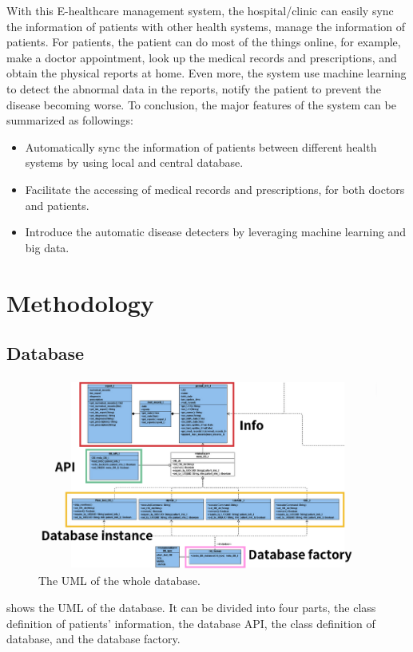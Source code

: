 \documentclass{article}
\begin{document}
  With this E-healthcare management system, the hospital/clinic can easily 
  sync the information of patients with other health systems, manage 
  the information of patients.
  For patients, the patient can do most of the things online, for example, 
  make a doctor appointment, look up the medical records and prescriptions, 
  and obtain the physical reports at home. Even more, the system use machine 
  learning to detect the abnormal data in the reports, notify the patient 
  to prevent the disease becoming worse. 
  To conclusion, the major features of the system can be summarized as 
  followings: 
  \begin{itemize}
    \item Automatically sync the information of patients between different health systems by using local and central database. 
    \item Facilitate the accessing of medical records and prescriptions, for both doctors and patients. 
    \item Introduce the automatic disease detecters by leveraging machine learning and big data. 
  \end{itemize}

\section{Methodology}
\label{sec:methodology}
  \subsection*{Database}
  \begin{figure}[h]
    \centering
    \includegraphics[scale = 0.7]{asset/database/DB_UML.png}
    \caption{The UML of the whole database.}
    \label{fig:DB_UML}
  \end{figure}
   shows the UML of the database. It can be divided into four 
  parts, the class definition of patients' information, the database API, the 
  class definition of database, and the database factory. 
\end{document}

